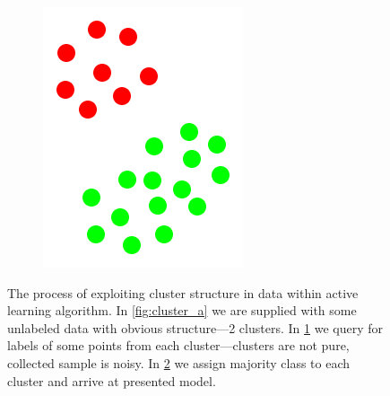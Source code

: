 \documentclass[12pt, a4paper, pdflatex, leqno, twoside]{report}
\begin{document}
\begin{figure}[htbp]
\begin{subfigure}[b]{0.3\textwidth}
    \caption{\label{fig:cluster_b}}
  \end{subfigure}
  \begin{subfigure}[b]{0.3\textwidth}
    \centering
    \includegraphics[width=0.5\linewidth]{graphics/cluster3.png}
    \caption{\label{fig:cluster_c}}
  \end{subfigure}
\begin{tiny}
\caption{The process of exploiting cluster structure in data within active 
learning algorithm. In \ref{fig:cluster_a} we are supplied with some unlabeled 
data with obvious structure---2 clusters. In \ref{fig:cluster_b} we query for 
labels of some points from each cluster---clusters are not pure, collected 
sample is noisy. In \ref{fig:cluster_c} we assign majority class to each 
cluster and arrive at presented model.\label{fig:cluster}}
\end{tiny}
\vspace{1cm}
\end{figure}
\end{document}
